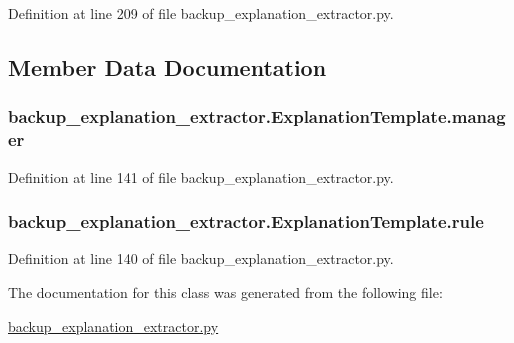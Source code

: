 Definition at line 209 of file backup\+\_\+explanation\+\_\+extractor.\+py.



\subsection{Member Data Documentation}
\hypertarget{classbackup__explanation__extractor_1_1_explanation_template_a210493351b1a5da793855d40db5495d1}{}
\subsubsection[{manager}]{\setlength{\rightskip}{0pt plus 5cm}backup\+\_\+explanation\+\_\+extractor.\+Explanation\+Template.\+manager}\label{classbackup__explanation__extractor_1_1_explanation_template_a210493351b1a5da793855d40db5495d1}


Definition at line 141 of file backup\+\_\+explanation\+\_\+extractor.\+py.

\hypertarget{classbackup__explanation__extractor_1_1_explanation_template_a2af6ecb7ac9890bc38f063369c1dd966}{}
\subsubsection[{rule}]{\setlength{\rightskip}{0pt plus 5cm}backup\+\_\+explanation\+\_\+extractor.\+Explanation\+Template.\+rule}\label{classbackup__explanation__extractor_1_1_explanation_template_a2af6ecb7ac9890bc38f063369c1dd966}


Definition at line 140 of file backup\+\_\+explanation\+\_\+extractor.\+py.



The documentation for this class was generated from the following file\+:\begin{DoxyCompactItemize}
\item 
\hyperlink{backup__explanation__extractor_8py}{backup\+\_\+explanation\+\_\+extractor.\+py}\end{DoxyCompactItemize}
